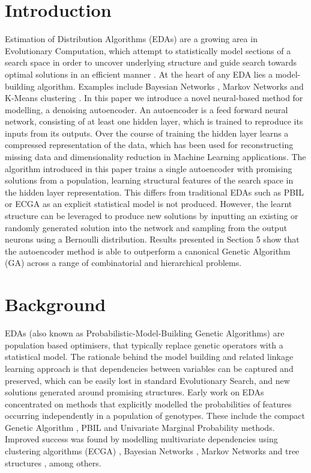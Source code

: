 \documentclass[runningheads,a4paper]{llncs}
\begin{document}
\section{Introduction}

Estimation of Distribution Algorithms (EDAs) are a growing area in Evolutionary Computation, which attempt to statistically model sections of a search space in order to uncover underlying structure and guide search towards optimal solutions in an efficient manner \cite{pelikan2006scalable}. At the heart of any EDA lies a model-building algorithm. Examples include Bayesian Networks \cite{hboa}, Markov Networks \cite{ref} and K-Means clustering \cite{ref}. In this paper we introduce a novel neural-based method for modelling, a denoising autoencoder. An autoencoder is a feed forward neural network, consisting of at least one hidden layer, which is trained to reproduce its inputs from its outputs. Over the course of training the hidden layer learns a compressed representation of the data, which has been used for reconstructing missing data \cite{ref} and dimensionality reduction \cite{ref} in Machine Learning applications. The algorithm introduced in this paper trains a single autoencoder with promising solutions from a population, learning structural features of the search space in the hidden layer representation. This differs from traditional EDAs such as PBIL \cite{ref } or ECGA \cite{ref} as an explicit statistical model is not produced. However, the learnt structure can be leveraged to produce new solutions by inputting an existing or randomly generated solution into the network and sampling from the output neurons using a Bernoulli distribution. Results presented in Section 5 show that the autoencoder method is able to outperform a canonical Genetic Algorithm (GA) across a range of combinatorial and hierarchical problems.

\section{Background}

EDAs (also known as Probabilistic-Model-Building Genetic Algorithms) are population based optimisers, that typically replace genetic operators with a statistical model. The rationale behind the model building and related linkage learning approach is that dependencies between variables can be captured and preserved, which can be easily lost in standard Evolutionary Search, and new solutions generated around promising structures. Early work on EDAs concentrated on methods that explicitly modelled the probabilities of features occurring independently in a population of genotypes. These include the compact Genetic Algorithm \cite{cha}, PBIL \cite{phil} and Univariate Marginal Probability methods\cite{uvmp}. Improved success was found by modelling multivariate dependencies using clustering algorithms (ECGA) \cite{ecga}, Bayesian Networks \cite{hboa}, Markov Networks \cite{mccall} and tree structures \cite{ltga}, among others.
\end{document}
